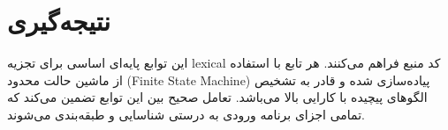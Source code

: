 \documentclass[12pt, a4paper]{report}
\begin{document}
\section{نتیجه‌گیری}
این توابع پایه‌ای اساسی برای تجزیه lexical کد منبع فراهم می‌کنند. هر تابع با استفاده از ماشین حالت محدود (Finite State Machine) پیاده‌سازی شده و قادر به تشخیص الگوهای پیچیده با کارایی بالا می‌باشد. تعامل صحیح بین این توابع تضمین می‌کند که تمامی اجزای برنامه ورودی به درستی شناسایی و طبقه‌بندی می‌شوند.
\end{document}
